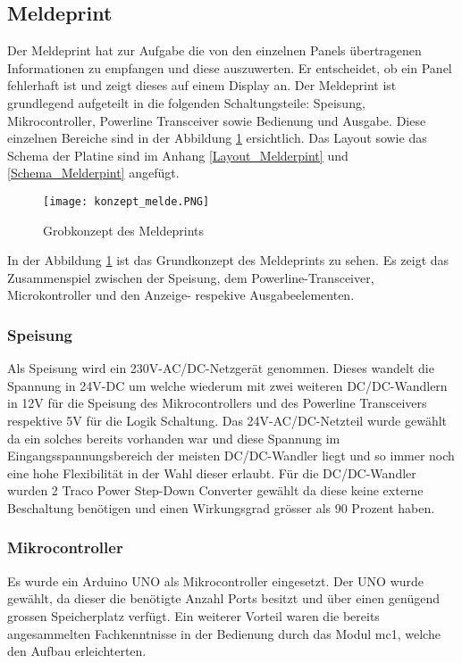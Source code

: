 \subsection{Meldeprint}
Der Meldeprint hat zur Aufgabe die von den einzelnen Panels übertragenen Informationen zu empfangen und diese auszuwerten. Er entscheidet, ob ein Panel fehlerhaft ist und zeigt dieses auf einem Display an. Der Meldeprint ist grundlegend aufgeteilt in die folgenden Schaltungsteile: Speisung, Mikrocontroller, Powerline Transceiver sowie Bedienung und Ausgabe. Diese einzelnen Bereiche sind in der Abbildung \ref{fig::HardKonzept} ersichtlich. Das Layout sowie das Schema der Platine sind im Anhang \ref{Layout_Melderpint} und \ref{Schema_Melderpint} angefügt.

\begin{figure}[h]
	\centering
	\texttt{[image: konzept\_melde.PNG]}
	\caption{Grobkonzept des Meldeprints}
	\label{fig::HardKonzept}	
\end{figure}

In der Abbildung \ref{fig::HardKonzept} ist das Grundkonzept des Meldeprints zu sehen. Es zeigt das Zusammenspiel zwischen der Speisung, dem Powerline-Transceiver, Microkontroller und den Anzeige- respekive Ausgabeelementen.

\subsubsection{Speisung}
Als Speisung wird ein 230V-AC/DC-Netzgerät genommen. Dieses wandelt die Spannung in 24V-DC um welche wiederum mit zwei weiteren DC/DC-Wandlern in 12V für die Speisung des Mikrocontrollers und des Powerline Transceivers respektive 5V für die Logik Schaltung. Das 24V-AC/DC-Netzteil wurde gewählt da ein solches bereits vorhanden war und diese Spannung im Eingangsspannungsbereich der meisten DC/DC-Wandler liegt und so immer noch eine hohe Flexibilität in der Wahl dieser erlaubt. Für die DC/DC-Wandler wurden 2 Traco Power Step-Down Converter gewählt da diese keine externe Beschaltung benötigen und einen Wirkungsgrad grösser als 90 Prozent haben.

\subsubsection{Mikrocontroller}
Es wurde ein Arduino UNO als Mikrocontroller eingesetzt. Der UNO wurde gewählt, da dieser die benötigte Anzahl Ports besitzt und über einen genügend grossen Speicherplatz verfügt. Ein weiterer Vorteil waren die bereits angesammelten Fachkenntnisse in der Bedienung durch das Modul mc1, welche den Aufbau erleichterten.


